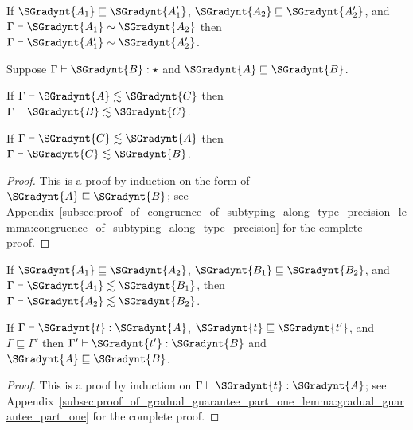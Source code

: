 \begin{corollary}
  \label{corollary:congruence_of_type_consistency_along_type_precision}
  If $ \SGradynt{A_{{\mathrm{1}}}}  \sqsubseteq  \SGradynt{A'_{{\mathrm{1}}}} $, $ \SGradynt{A_{{\mathrm{2}}}}  \sqsubseteq  \SGradynt{A'_{{\mathrm{2}}}} $, and $ \Gamma  \vdash  \SGradynt{A_{{\mathrm{1}}}}  \sim  \SGradynt{A_{{\mathrm{2}}}} $ then
  $ \Gamma  \vdash  \SGradynt{A'_{{\mathrm{1}}}}  \sim  \SGradynt{A'_{{\mathrm{2}}}} $.  
\end{corollary}

\begin{lemma}
  \label{lemma:congruence_of_subtyping_along_type_precision}
  Suppose $ \Gamma  \vdash  \SGradynt{B}  : \star $ and $ \SGradynt{A}  \sqsubseteq  \SGradynt{B} $.
  \begin{enumR}
  \item If $ \Gamma  \vdash  \SGradynt{A}  \lesssim  \SGradynt{C} $ then $ \Gamma  \vdash  \SGradynt{B}  \lesssim  \SGradynt{C} $.

  \item If $ \Gamma  \vdash  \SGradynt{C}  \lesssim  \SGradynt{A} $ then $ \Gamma  \vdash  \SGradynt{C}  \lesssim  \SGradynt{B} $.  
  \end{enumR}
\end{lemma}
\begin{proof}
  This is a proof by induction on the form of $ \SGradynt{A}  \sqsubseteq  \SGradynt{B} $; see
  Appendix~\ref{subsec:proof_of_congruence_of_subtyping_along_type_precision_lemma:congruence_of_subtyping_along_type_precision}
  for the complete proof.
\end{proof}

\begin{corollary}
  \label{corollary:congruence_of_subtyping_along_type_precision}
  If $ \SGradynt{A_{{\mathrm{1}}}}  \sqsubseteq  \SGradynt{A_{{\mathrm{2}}}} $, $ \SGradynt{B_{{\mathrm{1}}}}  \sqsubseteq  \SGradynt{B_{{\mathrm{2}}}} $, and $ \Gamma  \vdash  \SGradynt{A_{{\mathrm{1}}}}  \lesssim  \SGradynt{B_{{\mathrm{1}}}} $, then $ \Gamma  \vdash  \SGradynt{A_{{\mathrm{2}}}}  \lesssim  \SGradynt{B_{{\mathrm{2}}}} $.
\end{corollary}

\begin{lemma}
  \label{lemma:gradual_guarantee_part_one}
  If $ \Gamma  \vdash  \SGradynt{t}  :  \SGradynt{A} $, $ \SGradynt{t}  \sqsubseteq  \SGradynt{t'} $, and $ \Gamma  \sqsubseteq  \Gamma' $ then $ \Gamma'  \vdash  \SGradynt{t'}  :  \SGradynt{B} $ and $ \SGradynt{A}  \sqsubseteq  \SGradynt{B} $.
\end{lemma}
\begin{proof}
  This is a proof by induction on $ \Gamma  \vdash  \SGradynt{t}  :  \SGradynt{A} $; see
  Appendix~\ref{subsec:proof_of_gradual_guarantee_part_one_lemma:gradual_guarantee_part_one}
  for the complete proof.
\end{proof}

